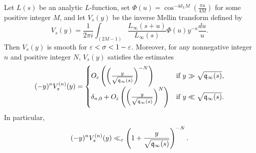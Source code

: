 \documentclass[12pt]{article}
\begin{document}
    \begin{proposition}\label{prop:V_function_decay}
      Let \(L(s)\) be an analytic \(L\)-function, set \(\Phi(u) = \cos^{-4d_{L}M}\left(\frac{\pi u}{4M}\right)\) for some positive integer \(M\), and let \(V_{s}(y)\) be the inverse Mellin transform defined by
      \[
        V_{s}(y) = \frac{1}{2\pi i}\int_{(2M-1)}\frac{L_{\infty}(s+u)}{L_{\infty}(s)}\Phi(u)y^{-u}\frac{du}{u}.
      \]
      Then \(V_{s}(y)\) is smooth for \(\varepsilon < \sigma < 1-\varepsilon\). Moreover, for any nonnegative integer \(n\) and positive integer \(N\), \(V_{s}(y)\) satisfies the estimates
      \[
        (-y)^{n}V_{s}^{(n)}(y) = \begin{cases} O_{\varepsilon}\left(\left(\frac{y}{\sqrt{\mathfrak{q}_{\infty}(s)}}\right)^{-N}\right) & \text{if \(y \gg \sqrt{\mathfrak{q}_{\infty}(s)}\)}, \\ \delta_{n,0}+O_{\varepsilon}\left(\left(\frac{y}{\sqrt{\mathfrak{q}_{\infty}(s)}}\right)^{N}\right) & \text{if \(y \ll \sqrt{\mathfrak{q}_{\infty}(s)}\)}. \end{cases}
      \]
      In particular,
      \[
        (-y)^{n}V_{s}^{(n)}(y) \ll_{\varepsilon} \left(1+\frac{y}{\sqrt{\mathfrak{q}_{\infty}(s)}}\right)^{-N}.
      \]
    \end{proposition}
\end{document}

